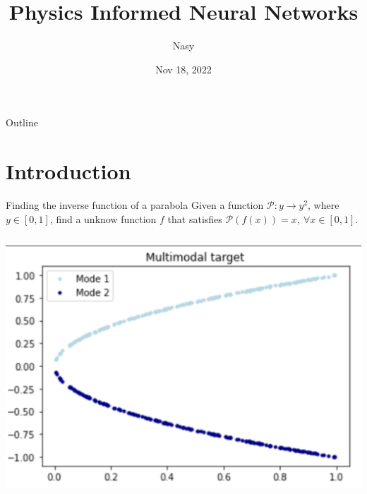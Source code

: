 \documentclass[aspectratio=1610,xcolor={dvipsnames},hyperref={colorlinks,unicode,linkcolor=violet,anchorcolor=BlueViolet,citecolor=YellowOrange,filecolor=black,urlcolor=Aquamarine}]{beamer}
\author{Nasy}
\date{Nov 18, 2022}
\title{Physics Informed Neural Networks}
\begin{document}
\maketitle
\begin{frame}{Outline}
\tableofcontents
\end{frame}


\section{Introduction}
\label{sec:org7a0ad47}

\begin{frame}[label={sec:org8c459a7}]{Finding the inverse function of a parabola}
Given a function \(\mathcal{P}: y \rightarrow y^{2}\), where \(y \in
[0, 1]\), find a unknow function \(f\) that satisfies
\(\mathcal{P}(f(x)) = x,\ \forall x \in [0, 1]\).

\begin{columns}
\begin{column}{0.6\columnwidth}
\begin{center}
\includegraphics[width=.9\linewidth]{./p1.png}
\end{center}
\end{column}
\end{columns}
\end{frame}
\end{document}
